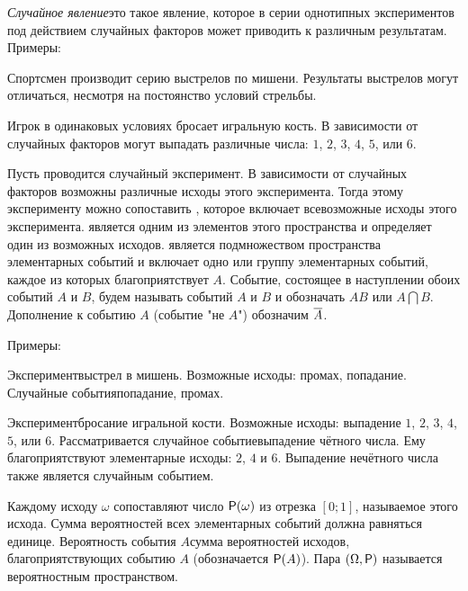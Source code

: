 \documentclass[a4paper,12pt]{article}
\renewcommand{\P}{{\sf P}}
\begin{document}

\emph{Случайное явление}\т это такое явление, которое в серии однотипных экспериментов под действием случайных факторов может приводить к различным результатам.
Примеры:
\begin{nums}{-5}
\item
Спортсмен производит серию выстрелов по мишени. Результаты выстрелов могут отличаться, несмотря на постоянство условий стрельбы.
\item
Игрок в одинаковых условиях бросает игральную кость. В зависимости от случайных факторов могут выпадать различные числа: $1$, $2$, $3$, $4$, $5$, или $6$.
\end{nums}

Пусть проводится случайный эксперимент. В зависимости от случайных факторов возможны различные исходы этого эксперимента. Тогда этому эксперименту можно сопоставить , которое включает всевозможные исходы этого эксперимента.  является одним из элементов этого пространства и определяет один из возможных исходов.  является подмножеством пространства элементарных событий и включает одно или группу элементарных событий, каждое из которых благоприятствует $A$.
Событие, состоящее в наступлении обоих событий $A$ и $B$, будем называть  событий $A$ и $B$ и обозначать $AB$ или $A \bigcap B$.
Дополнение к событию $A$ (событие "не $A$") обозначим $\overline{A}$.

Примеры:
\begin{nums}{-5}
\item
Эксперимент\т выстрел в мишень. Возможные исходы: промах, попадание. Случайные события\т попадание, промах.
\item
Эксперимент\т бросание игральной кости. Возможные исходы: выпадение $1$, $2$, $3$, $4$, $5$, или $6$. Рассматривается случайное событие\т выпадение чётного числа. Ему благоприятствуют элементарные исходы: $2$, $4$ и $6$. Выпадение нечётного числа также является случайным событием.
\end{nums}

Каждому исходу $\omega$ сопоставляют число $\P(\omega)$ из отрезка $[0;1]$, называемое  этого исхода. Сумма вероятностей всех элементарных событий должна равняться единице. Вероятность события $A$\т сумма вероятностей исходов, благоприятствующих событию $A$ (обозначается $\P(A)$). Пара $(\Omega, \P)$ называется вероятностным пространством.
\end{document}

